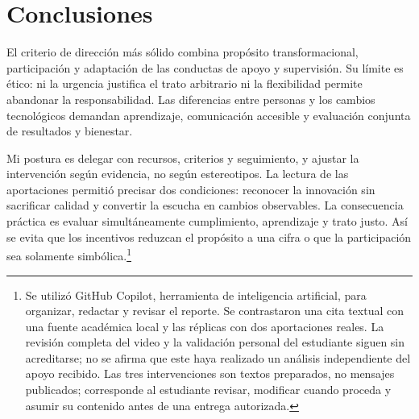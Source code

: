 \documentclass[11pt,letterpaper,oneside]{article}
\begin{document}
\clearpage
\section{Conclusiones}
El criterio de dirección más sólido combina propósito transformacional, participación y adaptación de las conductas de apoyo y supervisión. Su límite es ético: ni la urgencia justifica el trato arbitrario ni la flexibilidad permite abandonar la responsabilidad. Las diferencias entre personas y los cambios tecnológicos demandan aprendizaje, comunicación accesible y evaluación conjunta de resultados y bienestar.

Mi postura es delegar con recursos, criterios y seguimiento, y ajustar la intervención según evidencia, no según estereotipos. La lectura de las aportaciones permitió precisar dos condiciones: reconocer la innovación sin sacrificar calidad y convertir la escucha en cambios observables. La consecuencia práctica es evaluar simultáneamente cumplimiento, aprendizaje y trato justo. Así se evita que los incentivos reduzcan el propósito a una cifra o que la participación sea solamente simbólica.\footnote{Se utilizó GitHub Copilot, herramienta de inteligencia artificial, para organizar, redactar y revisar el reporte. Se contrastaron una cita textual con una fuente académica local y las réplicas con dos aportaciones reales. La revisión completa del video y la validación personal del estudiante siguen sin acreditarse; no se afirma que este haya realizado un análisis independiente del apoyo recibido. Las tres intervenciones son textos preparados, no mensajes publicados; corresponde al estudiante revisar, modificar cuando proceda y asumir su contenido antes de una entrega autorizada.}

\clearpage

\end{document}
